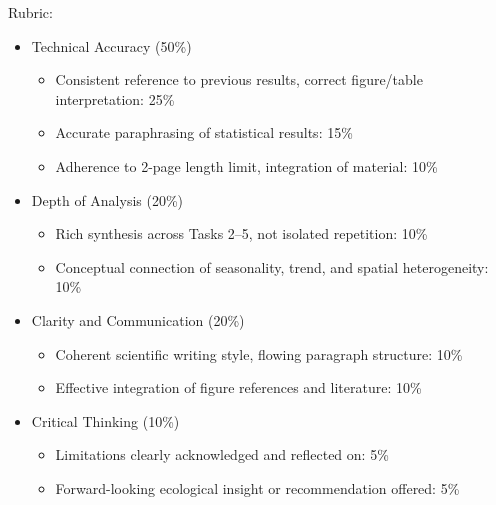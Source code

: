 \documentclass[
  10pt,
]{article}
\providecommand{\tightlist}{%
  \setlength{\itemsep}{0pt}\setlength{\parskip}{0pt}}
\begin{document}
Rubric:

\begin{itemize}
\tightlist
\item
  Technical Accuracy (50\%)

  \begin{itemize}
  \tightlist
  \item
    Consistent reference to previous results, correct figure/table
    interpretation: 25\%
  \item
    Accurate paraphrasing of statistical results: 15\%
  \item
    Adherence to 2-page length limit, integration of material: 10\%
  \end{itemize}
\item
  Depth of Analysis (20\%)

  \begin{itemize}
  \tightlist
  \item
    Rich synthesis across Tasks 2--5, not isolated repetition: 10\%
  \item
    Conceptual connection of seasonality, trend, and spatial
    heterogeneity: 10\%
  \end{itemize}
\item
  Clarity and Communication (20\%)

  \begin{itemize}
  \tightlist
  \item
    Coherent scientific writing style, flowing paragraph structure: 10\%
  \item
    Effective integration of figure references and literature: 10\%
  \end{itemize}
\item
  Critical Thinking (10\%)

  \begin{itemize}
  \tightlist
  \item
    Limitations clearly acknowledged and reflected on: 5\%
  \item
    Forward-looking ecological insight or recommendation offered: 5\%
  \end{itemize}
\end{itemize}
\end{document}
